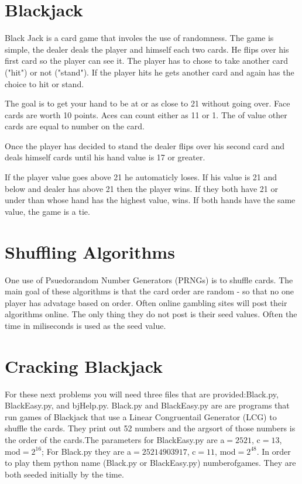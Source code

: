\label{Ch:BJ}


\section*{Blackjack}


Black Jack is a card game that involes the use of randomness. The game is simple, the dealer deals the player and himself each two cards. He flips over his first card so the player can see it. The player has to chose to take another card ("hit") or not ("stand"). If the player hits he gets another card and again has the choice to hit or stand.

The goal is to get your hand to be at or as close to 21 without going over. Face cards are worth 10 points. Aces can count either as 11 or 1. The of value other cards are equal to number on the card.

Once the player has decided to stand the dealer flips over his second card and deals himself cards until his hand value is 17 or greater. 

If the player value goes above 21 he automaticly loses. If his value is 21 and below and dealer has above 21 then the player wins. If they both have 21 or under than whose hand has the highest value, wins. If both hands have the same value, the game is a tie.

\section*{Shuffling Algorithms}

One use of Psuedorandom Number Generators (PRNGs) is to shuffle cards. The main goal of these algorithms is that the card order are random - so that no one player has advatage based on order. Often online gambling sites will post their algorithms online. The only thing they do not post is their seed values. Often the time in miliseconds is used as the seed value.

\section*{Cracking Blackjack}
For these next problems you will need three files that are provided:Black.py, BlackEasy.py, and bjHelp.py.  Black.py and BlackEasy.py are are programs that run games of Blackjack that use a Linear Congruentail Generator (LCG) to shuffle the cards. They print out 52 numbers and the argsort of those numbers is the order of the cards.The parameters for BlackEasy.py are a$=2521$, c$=13$, mod$=2^{16}$; For Black.py they are a$=25214903917$, c$=11$, mod$=2^{48}$. In order to play them python name (Black.py or BlackEasy.py) numberofgames. They are both seeded initially by the time.


